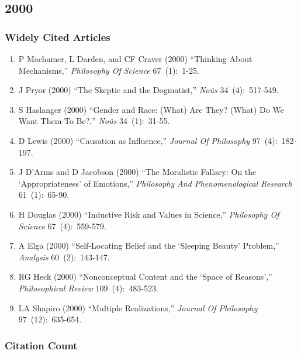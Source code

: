 \documentclass[
  10pt,
  letterpaper,
  DIV=11,
  numbers=noendperiod,
  twoside]{scrartcl}
\providecommand{\tightlist}{%
  \setlength{\itemsep}{0pt}\setlength{\parskip}{0pt}}\usepackage{longtable,booktabs,array}
\begin{document}
\newpage

\subsection{2000}\label{sec-s2000}

\subsubsection*{Widely Cited Articles}\label{widely-cited-articles-43}

\begin{enumerate}
\def\labelenumi{\arabic{enumi}.}
\tightlist
\item
  P Machamer, L Darden, and CF Craver (2000) ``Thinking About
  Mechanisms,'' \emph{Philosophy Of Science} 67~(1):~1-25.
\item
  J Pryor (2000) ``The Skeptic and the Dogmatist,'' \emph{Noûs}
  34~(4):~517-549.
\item
  S Haslanger (2000) ``Gender and Race: (What) Are They? (What) Do We
  Want Them To Be?,'' \emph{Noûs} 34~(1):~31-55.
\item
  D Lewis (2000) ``Causation as Influence,'' \emph{Journal Of
  Philosophy} 97~(4):~182-197.
\item
  J D'Arms and D Jacobson (2000) ``The Moralistic Fallacy: On the
  `Appropriateness' of Emotions,'' \emph{Philosophy And Phenomenological
  Research} 61~(1):~65-90.
\item
  H Douglas (2000) ``Inductive Risk and Values in Science,''
  \emph{Philosophy Of Science} 67~(4):~559-579.
\item
  A Elga (2000) ``Self-Locating Belief and the `Sleeping Beauty'
  Problem,'' \emph{Analysis} 60~(2):~143-147.
\item
  RG Heck (2000) ``Nonconceptual Content and the `Space of Reasons',''
  \emph{Philosophical Review} 109~(4):~483-523.
\item
  LA Shapiro (2000) ``Multiple Realizations,'' \emph{Journal Of
  Philosophy} 97~(12):~635-654.
\end{enumerate}

\subsubsection*{Citation Count}\label{sec-count-2000}
\end{document}

